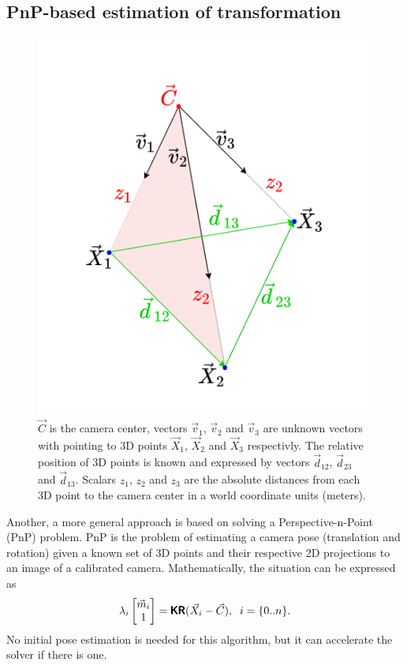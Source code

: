 \subsection{PnP-based estimation of transformation}
\begin{figure}[h]
    \centering
    \includegraphics[width=.4\textwidth]{graphics/p3p.png}
    \caption[Visualization of the P3P problem.]{$\vec{C}$ is the camera center, vectors $\vec{v}_1$, $\vec{v}_2$ and $\vec{v}_3$ are unknown vectors with pointing to 3D points $\vec{X}_1$, $\vec{X}_2$ and $\vec{X}_3$ respectivly. The relative position of 3D points is known and expressed by vectors $\vec{d}_{12}$, $\vec{d}_{23}$ and $\vec{d}_{13}$. Scalars $z_1$, $z_2$ and $z_3$ are the absolute distances from each 3D point to the camera center in a world coordinate units (meters).}
    \label{fig:p3p}
\end{figure}

\label{sec:pnp}
Another, a more general approach is based on solving a Perspective-n-Point (PnP) problem.
PnP is the problem of estimating a camera pose (translation and rotation) given a known set of 3D points and their respective 2D projections to an image of a calibrated camera.
Mathematically, the situation can be expressed as
\begin{equation}
    \label{eq:pnp_intro}
    \lambda_i \begin{bmatrix} \vec{m}_i \\ 1 \end{bmatrix} = \pmb{\mathsf{K}} \pmb{\mathsf{R}} (\vec{X}_i - \vec{C}), \;\; i = \{0..n\}.
\end{equation}
No initial pose estimation is needed for this algorithm, but it can accelerate the solver if there is one.

